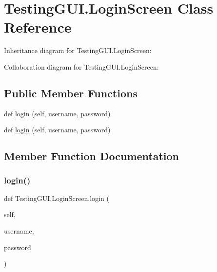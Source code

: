 \hypertarget{classTestingGUI_1_1LoginScreen}{}\section{Testing\+G\+U\+I.\+Login\+Screen Class Reference}
\label{classTestingGUI_1_1LoginScreen}


Inheritance diagram for Testing\+G\+U\+I.\+Login\+Screen\+:


Collaboration diagram for Testing\+G\+U\+I.\+Login\+Screen\+:
\subsection*{Public Member Functions}
\begin{DoxyCompactItemize}
\item 
def \hyperlink{classTestingGUI_1_1LoginScreen_a4a73599bf5eda0f45a27c541a6daf599}{login} (self, username, password)
\item 
def \hyperlink{classTestingGUI_1_1LoginScreen_a4a73599bf5eda0f45a27c541a6daf599}{login} (self, username, password)
\end{DoxyCompactItemize}


\subsection{Member Function Documentation}
\mbox{\label{classTestingGUI_1_1LoginScreen_a4a73599bf5eda0f45a27c541a6daf599}} 
\subsubsection{\texorpdfstring{login()}{login()}\hspace{0.1cm}{\footnotesize\ttfamily [1/2]}}
{\footnotesize\ttfamily def Testing\+G\+U\+I.\+Login\+Screen.\+login (\begin{DoxyParamCaption}\item[{}]{self,  }\item[{}]{username,  }\item[{}]{password }\end{DoxyParamCaption})}

\mbox{\label{classTestingGUI_1_1LoginScreen_a4a73599bf5eda0f45a27c541a6daf599}} 
